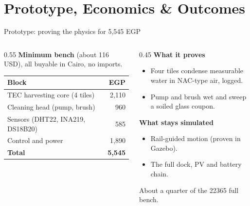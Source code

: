\documentclass[aspectratio=169,10pt]{beamer}
\begin{document}
\section{Prototype, Economics \& Outcomes}
\begin{frame}{Prototype: proving the physics for 5{,}545 EGP}
  \begin{columns}[T]
    \begin{column}{0.55\textwidth}
      \textbf{Minimum bench} (about \SI{116}{} USD), all buyable in Cairo, no imports.
      \begin{center}\small
      \begin{tabular}{lr}
        \toprule
        Block & EGP \\
        \midrule
        TEC harvesting core (4 tiles) & 2{,}110 \\
        Cleaning head (pump, brush) & 960 \\
        Sensors (DHT22, INA219, DS18B20) & 585 \\
        Control and power & 1{,}890 \\
        \midrule
        \textbf{Total} & \textbf{5{,}545} \\
        \bottomrule
      \end{tabular}
      \end{center}
    \end{column}
    \begin{column}{0.45\textwidth}
      \textbf{What it proves}
      \begin{itemize}\small\setlength\itemsep{0.3em}
        \item Four tiles condense measurable water in NAC-type air, logged.
        \item Pump and brush wet and sweep a soiled glass coupon.
      \end{itemize}
      \vspace{0.4em}
      \textbf{What stays simulated}
      \begin{itemize}\small\setlength\itemsep{0.3em}
        \item Rail-guided motion (proven in Gazebo).
        \item The full dock, PV and battery chain.
      \end{itemize}
      About a quarter of the \SI{22365}{\EGP} full bench.
    \end{column}
  \end{columns}
\end{frame}
\end{document}
